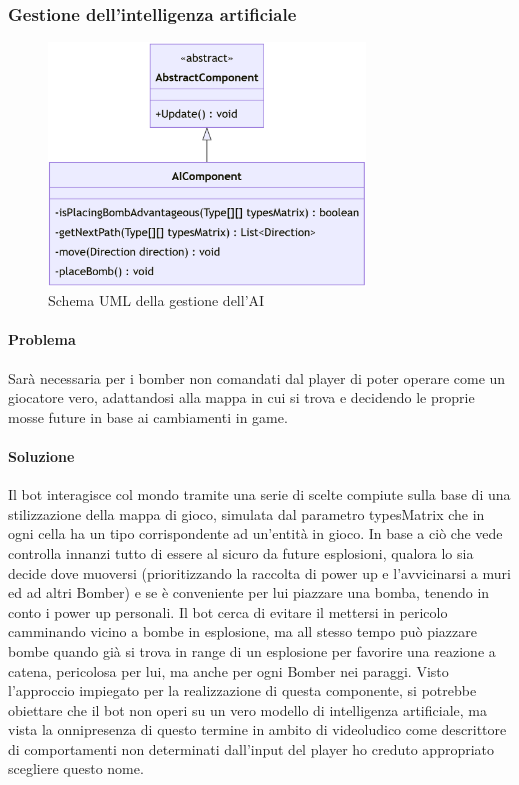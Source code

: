 \documentclass[a4paper,12pt]{report}
\begin{document}
%
\subsubsection*{Gestione dell'intelligenza artificiale}
%
\begin{figure}[H]
    \centering{}
    \includegraphics[width=0.75\textwidth]{img/UMLAI.png}
    \caption{Schema UML della gestione dell'AI}
    \label{}
\end{figure}
%
\paragraph*{Problema} Sarà necessaria per i bomber non comandati dal player di poter operare come un giocatore vero, adattandosi alla mappa in cui si trova e decidendo le proprie mosse future in base ai cambiamenti in game.
%
\paragraph*{Soluzione}  Il bot interagisce col mondo tramite una serie di scelte compiute sulla base di una stilizzazione della mappa di gioco, simulata dal parametro typesMatrix che in ogni cella ha un tipo corrispondente ad un’entità in gioco.
In base a ciò che vede controlla innanzi tutto di essere al sicuro da future esplosioni, qualora lo sia decide dove muoversi (prioritizzando la raccolta di power up e l’avvicinarsi a muri ed ad altri Bomber) e se è conveniente per lui piazzare una bomba, tenendo in conto i power up personali.
Il bot cerca di evitare il mettersi in pericolo camminando vicino a bombe in esplosione, ma all stesso tempo può piazzare bombe quando già si trova in range di un esplosione per favorire una reazione a catena, pericolosa per lui, ma anche per ogni Bomber nei paraggi.
Visto l’approccio impiegato per la realizzazione di questa componente, si potrebbe obiettare che il bot non operi su un vero modello di intelligenza artificiale, ma vista la onnipresenza di questo termine in ambito di videoludico come descrittore di comportamenti non determinati dall’input del player ho creduto appropriato scegliere questo nome.
\end{document}
